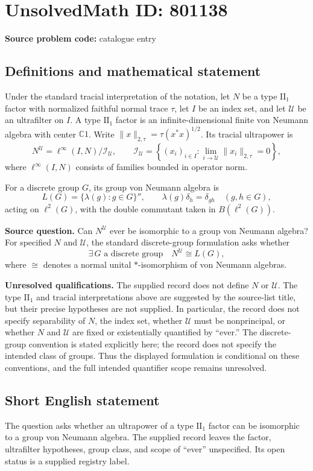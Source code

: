 \documentclass[11pt]{article}
\newcommand{\C}{\mathbb{C}}
\begin{document}
\section*{UnsolvedMath ID: 801138}
\textbf{Source problem code:} catalogue entry
\subsection{Definitions and mathematical statement}
Under the standard tracial interpretation of the notation, let \(N\) be a type \(\mathrm{II}_1\) factor with normalized faithful normal trace \(\tau\), let \(I\) be an index set, and let \(\mathcal U\) be an ultrafilter on \(I\). A type \(\mathrm{II}_1\) factor is an infinite-dimensional finite von Neumann algebra with center \(\C 1\). Write \(\|x\|_{2,\tau}=\tau(x^*x)^{1/2}\). Its tracial ultrapower is
\[
N^{\mathcal U}
=
\ell^\infty(I,N)\big/\mathcal I_{\mathcal U},
\qquad
\mathcal I_{\mathcal U}
=
\left\{(x_i)_{i\in I}:\lim_{i\to\mathcal U}\|x_i\|_{2,\tau}=0\right\},
\]
where \(\ell^\infty(I,N)\) consists of families bounded in operator norm.

For a discrete group \(G\), its group von Neumann algebra is
\[
L(G)=\{\lambda(g):g\in G\}'',
\qquad
\lambda(g)\delta_h=\delta_{gh}
\quad(g,h\in G),
\]
acting on \(\ell^2(G)\), with the double commutant taken in \(B(\ell^2(G))\).

\textbf{Source question.} Can \(N^{\mathcal U}\) ever be isomorphic to a group von Neumann algebra? For specified \(N\) and \(\mathcal U\), the standard discrete-group formulation asks whether
\[
\exists\,G\text{ a discrete group}\quad N^{\mathcal U}\cong L(G),
\]
where \(\cong\) denotes a normal unital \(*\)-isomorphism of von Neumann algebras.

\textbf{Unresolved qualifications.} The supplied record does not define \(N\) or \(\mathcal U\). The type \(\mathrm{II}_1\) and tracial interpretations above are suggested by the source-list title, but their precise hypotheses are not supplied. In particular, the record does not specify separability of \(N\), the index set, whether \(\mathcal U\) must be nonprincipal, or whether \(N\) and \(\mathcal U\) are fixed or existentially quantified by ``ever.'' The discrete-group convention is stated explicitly here; the record does not specify the intended class of groups. Thus the displayed formulation is conditional on these conventions, and the full intended quantifier scope remains unresolved.
\subsection{Short English statement}
The question asks whether an ultrapower of a type \(\mathrm{II}_1\) factor can be isomorphic to a group von Neumann algebra. The supplied record leaves the factor, ultrafilter hypotheses, group class, and scope of ``ever'' unspecified. Its open status is a supplied registry label.
\end{document}
